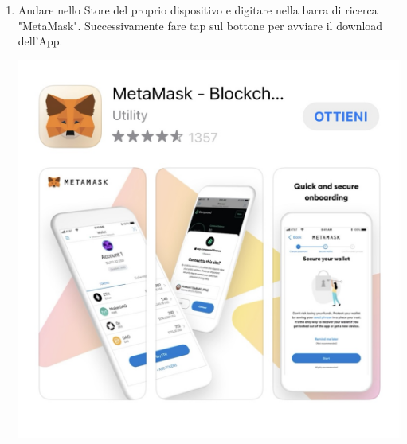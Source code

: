 \begin{enumerate}
    \item Andare nello Store del proprio dispositivo e digitare nella barra di ricerca "MetaMask". Successivamente fare tap sul bottone per avviare il download dell'App. \\
    \begin{center}
        \includegraphics[scale = 0.2]{img/metamask_mobile_store1.jpg}\\
    \end{center}
    

\end{enumerate}
